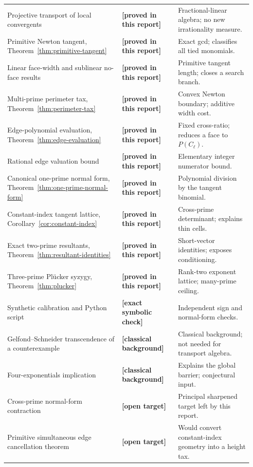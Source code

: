 \documentclass[11pt,oneside]{article}
\theoremstyle{definition}
\theoremstyle{remark}
\newcommand{\provedhere}{\textcolor{proofgreen}{\textbf{[proved in this report]}}}
\newcommand{\exactcheck}{\textcolor{exactviolet}{\textbf{[exact symbolic check]}}}
\newcommand{\openstatus}{\textcolor{openred}{\textbf{[open target]}}}
\newcommand{\knownstatus}{\textcolor{contextgray}{\textbf{[classical background]}}}
\begin{document}
\begin{longtable}{@{}p{}p{}p{}@{}}
Projective transport of local convergents
& \provedhere
& Fractional-linear algebra; no new irrationality measure.\\

Primitive Newton tangent, Theorem~\ref{thm:primitive-tangent}
& \provedhere
& Exact gcd; classifies all tied monomials.\\

Linear face-width and sublinear no-face results
& \provedhere
& Primitive tangent length; closes a search branch.\\

Multi-prime perimeter tax, Theorem~\ref{thm:perimeter-tax}
& \provedhere
& Convex Newton boundary; additive width cost.\\

Edge-polynomial evaluation, Theorem~\ref{thm:edge-evaluation}
& \provedhere
& Fixed cross-ratio; reduces a face to $P(C_\ell)$.\\

Rational edge valuation bound
& \provedhere
& Elementary integer numerator bound.\\

Canonical one-prime normal form, Theorem~\ref{thm:one-prime-normal-form}
& \provedhere
& Polynomial division by the tangent binomial.\\

Constant-index tangent lattice, Corollary~\ref{cor:constant-index}
& \provedhere
& Cross-prime determinant; explains thin cells.\\

Exact two-prime resultants, Theorem~\ref{thm:resultant-identities}
& \provedhere
& Short-vector identities; exposes conditioning.\\

Three-prime Pl\"ucker syzygy, Theorem~\ref{thm:plucker}
& \provedhere
& Rank-two exponent lattice; many-prime ceiling.\\

Synthetic calibration and Python script
& \exactcheck
& Independent sign and normal-form checks.\\

Gelfond--Schneider transcendence of a counterexample
& \knownstatus
& Classical background; not needed for transport algebra.\\

Four-exponentials implication
& \knownstatus
& Explains the global barrier; conjectural input.\\

Cross-prime normal-form contraction
& \openstatus
& Principal sharpened target left by this report.\\

Primitive simultaneous edge cancellation theorem
& \openstatus
& Would convert constant-index geometry into a height tax.\\
\bottomrule
\end{longtable}
\end{document}
